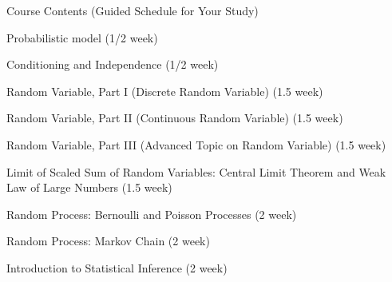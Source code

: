 \begin{frame}{Course Contents (Guided Schedule for Your Study)}

\plitemsep 0.1in


\small
\bce[1.]

\item Probabilistic model (1/2 week) 

\item Conditioning and Independence (1/2 week) 

\item Random Variable, Part I (Discrete Random Variable) (1.5 week)


\item Random Variable, Part II (Continuous Random Variable) (1.5 week)


\item Random Variable, Part III (Advanced Topic on Random Variable)
  (1.5 week) 


\item Limit of Scaled Sum of Random Variables: Central Limit Theorem
  and Weak Law of Large Numbers (1.5 week) 

\item Random Process: Bernoulli and Poisson Processes (2 week)


\item Random Process: Markov Chain (2 week) 

\item Introduction to Statistical Inference (2 week) 

  \ece

\end{frame}






